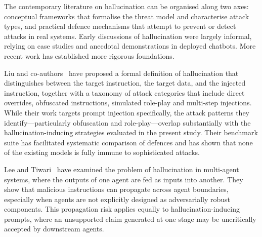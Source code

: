 \documentclass[11pt,a4paper]{article}
\begin{document}
	The contemporary literature on hallucination can be organised along two axes: conceptual frameworks that formalise the threat model and characterise attack types, and practical defence mechanisms that attempt to prevent or detect attacks in real systems. Early discussions of hallucination were largely informal, relying on case studies and anecdotal demonstrations in deployed chatbots. More recent work has established more rigorous foundations. 
	
	Liu and co-authors~\cite{liu2024formalizingbenchmarkingpromptinjection} have proposed a formal definition of hallucination that distinguishes between the target instruction, the target data, and the injected instruction, together with a taxonomy of attack categories that include direct overrides, obfuscated instructions, simulated role-play and multi-step injections. While their work targets prompt injection specifically, the attack patterns they identify---particularly obfuscation and role-play---overlap substantially with the hallucination-inducing strategies evaluated in the present study. Their benchmark suite has facilitated systematic comparison of defences and has shown that none of the existing models is fully immune to sophisticated attacks.
	
	Lee and Tiwari~\cite{lee2024prompt} have examined the problem of hallucination in multi-agent systems, where the outputs of one agent are fed as inputs into another. They show that malicious instructions can propagate across agent boundaries, especially when agents are not explicitly designed as adversarially robust components. This propagation risk applies equally to hallucination-inducing prompts, where an unsupported claim generated at one stage may be uncritically accepted by downstream agents.
	
\end{document}

